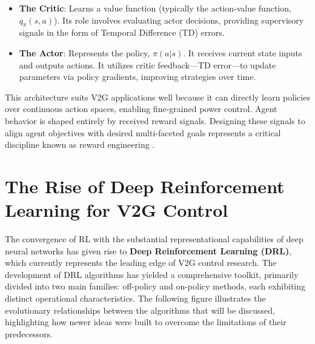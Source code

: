 \begin{itemize}
    \item \textbf{The Critic}: Learns a value function (typically the action-value function, $q_{\pi}(s, a)$). Its role involves evaluating actor decisions, providing supervisory signals in the form of Temporal Difference (TD) errors.
    
    \item \textbf{The Actor}: Represents the policy, $\pi(a|s)$. It receives current state inputs and outputs actions. It utilizes critic feedback—TD error—to update parameters via policy gradients, improving strategies over time.
\end{itemize}
\noindent
This architecture suits V2G applications well because it can directly learn policies over continuous action spaces, enabling fine-grained power control. Agent behavior is shaped entirely by received reward signals. Designing these signals to align agent objectives with desired multi-faceted goals represents a critical discipline known as reward engineering \cite{Xie2025, Zhang2023}.



 

\newpage
\section{The Rise of Deep Reinforcement Learning for V2G Control}

The convergence of RL with the substantial representational capabilities of deep neural networks has given rise to \textbf{Deep Reinforcement Learning (DRL)}, which currently represents the leading edge of V2G control research. The development of DRL algorithms has yielded a comprehensive toolkit, primarily divided into two main families: off-policy and on-policy methods, each exhibiting distinct operational characteristics.
The following figure illustrates the evolutionary relationships between the algorithms that  will be discussed, highlighting how newer ideas were built to overcome the limitations of their predecessors.

